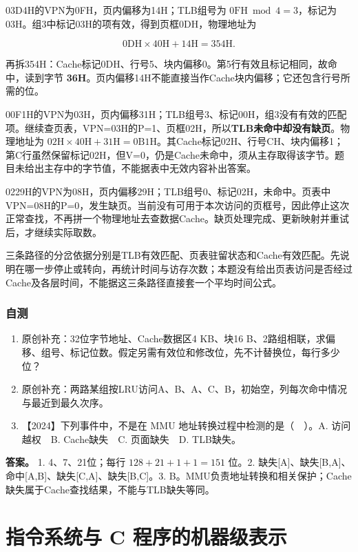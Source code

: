 03D4H的VPN为0FH，页内偏移为14H；TLB组号为 \(0\mathrm{FH}\bmod4=3\)，标记为03H。组3中标记03H的项有效，得到页框0DH，物理地址为

\[
0\mathrm{DH}\times40\mathrm{H}+14\mathrm{H}=354\mathrm{H}.
\]

再拆354H：Cache标记0DH、行号5、块内偏移0。第5行有效且标记相同，故命中，读到字节 \textbf{36H}。页内偏移14H不能直接当作Cache块内偏移；它还包含行号所需的位。

00F1H的VPN为03H，页内偏移31H；TLB组号3、标记00H，组3没有有效的匹配项。继续查页表，VPN=03H的P=1、页框02H，所以\textbf{TLB未命中却没有缺页}。物理地址为 \(02\mathrm{H}\times40\mathrm{H}+31\mathrm{H}=0\mathrm{B1H}\)。其Cache标记02H、行号CH、块内偏移1；第C行虽然保留标记02H，但V=0，仍是Cache未命中，须从主存取得该字节。题目未给出主存中的字节值，不能据表中无效内容补出答案。

0229H的VPN为08H，页内偏移29H；TLB组号0、标记02H，未命中。页表中VPN=08H的P=0，发生缺页。当前没有可用于本次访问的页框号，因此停止这次正常查找，不再拼一个物理地址去查数据Cache。缺页处理完成、更新映射并重试后，才继续实际取数。

三条路径的分岔依据分别是TLB有效匹配、页表驻留状态和Cache有效匹配。先说明在哪一步停止或转向，再统计时间与访存次数；本题没有给出页表访问是否经过Cache及各层时间，不能据这三条路径直接套一个平均时间公式。

\subsection{自测}\label{co-self3}

\begin{enumerate}
\def\labelenumi{\arabic{enumi}.}
\tightlist
\item
  原创补充：32位字节地址、Cache数据区4 KB、块16 B、2路组相联，求偏移、组号、标记位数。假定另需有效位和修改位，先不计替换位，每行多少位？
\item
  原创补充：两路某组按LRU访问A、B、A、C、B，初始空，列每次命中情况与最近到最久次序。
\item
  【2024】下列事件中，不是在 MMU 地址转换过程中检测的是（　）。A. 访问越权　B. Cache缺失　C. 页面缺失　D. TLB缺失。
\end{enumerate}

\textbf{答案。} 1. 4、7、21位；每行 \(128+21+1+1=151\) 位。2. 缺失{[}A{]}、缺失{[}B,A{]}、命中{[}A,B{]}、缺失{[}C,A{]}、缺失{[}B,C{]}。3. B。MMU负责地址转换和相关保护；Cache缺失属于Cache查找结果，不能与TLB缺失等同。

\chapter{指令系统与 C 程序的机器级表示}\label{co-ch4}

